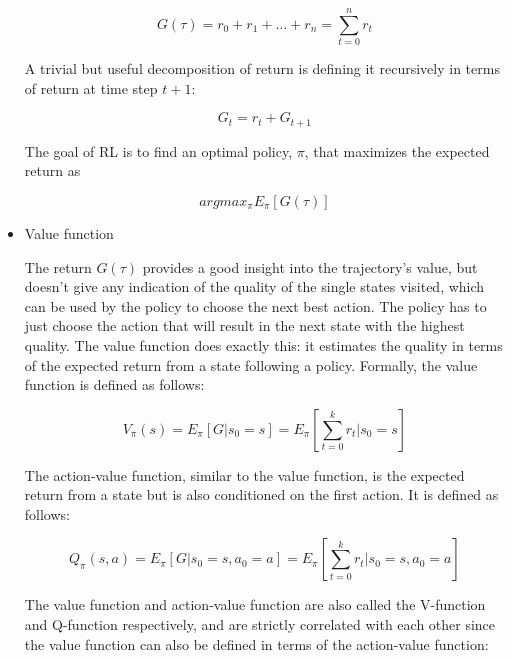 \begin{itemize}
    \begin{equation} \label{eq:mdp_return}
        G(\tau) = r_0 + r_1 + \dots + r_n = \sum \limits_{t=0}^n r_t
    \end{equation}

    A trivial but useful decomposition of return is defining it recursively in terms of return at time step $t+1$:


    \begin{equation} \label{eq:mdp_return_rec}
        G_t = r_t + G_{t+1}
    \end{equation}

    The goal of RL is to find an optimal policy, $\pi$, that maximizes the expected return as

    \begin{equation} \label{eq:mdp_rl_goal}
        argmax_\pi E_\pi[G(\tau)]
    \end{equation}

    \item Value function

    The return $G(\tau)$ provides a good insight into the trajectory's value, but doesn't give any indication of the quality of the single states visited, which can be used by the policy to choose the next best action.
    The policy has to just choose the action that will result in the next state with the highest quality.
    The value function does exactly this: it estimates the quality in terms of the expected return from a state following a policy.
    Formally, the value function is defined as follows:

    \begin{equation} \label{eq:mdp_value_function}
        V_\pi(s) = E_\pi[G|s_0=s] = E_\pi[ \sum \limits_{t=0}^k r_t |s_0 =s]
    \end{equation}

    The action-value function, similar to the value function, is the expected return from a state but is also conditioned on the first action.
    It is defined as follows:

    \begin{equation} \label{eq:mdp_action_value_function}
        Q_\pi(s, a) = E_\pi[G|s_0=s, a_0=a] = E_\pi [ \sum \limits_{t=0}^k r_t | s_0=s, a_0=a ]
    \end{equation}

    The value function and action-value function are also called the V-function and Q-function respectively, and are strictly correlated with each other since the value function can also be defined in terms of the action-value function:


\end{itemize}

